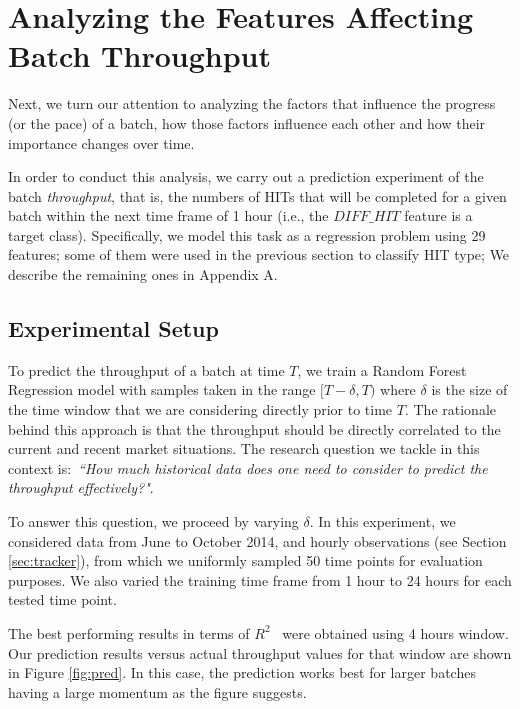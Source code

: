 \section{Analyzing the Features Affecting Batch Throughput}
\label{sec:throughput}
Next, we turn our attention to analyzing the factors that influence the progress (or the pace) of a batch, how those factors influence each other and how their importance changes over time. 

In order to conduct this analysis, we carry out a prediction experiment of the batch \emph{throughput}, that is, the numbers of HITs that  will be completed for a given batch within the next time frame of 1 hour (i.e.,  the $DIFF\_HIT$ feature is a target class).
Specifically, we model this task as a regression problem using 29 features; some of them were used in the previous section to classify HIT type; We describe the remaining ones in Appendix A.

\subsection{Experimental Setup}

To predict the throughput of a batch at time $T$, we train a Random Forest Regression model with samples taken in the range $[T-\delta, T)$ where $\delta$ is the size of the time window that we are   considering directly prior to time $T$. The rationale behind this approach is that the throughput should be directly correlated to the current and recent market situations. 
The research question we tackle in this context is:~\emph{``How much historical data does one need to consider to predict the throughput effectively?"}.
 
To answer this question, we proceed by varying $\delta$. In this experiment, we considered  data from June to October 2014, and hourly observations (see Section \ref{sec:tracker}), from which we uniformly sampled 50 time points for evaluation purposes. 
We also varied the training time frame from 1 hour to 24 hours for each tested time point. 

The best performing results in terms of $R^2$~\cite{sklearnweb, sklearn} were obtained using 4 hours window. Our prediction results versus actual throughput values for that window are shown in Figure \ref{fig:pred}. In this case, the prediction works best for larger batches having a large momentum as the figure suggests.



